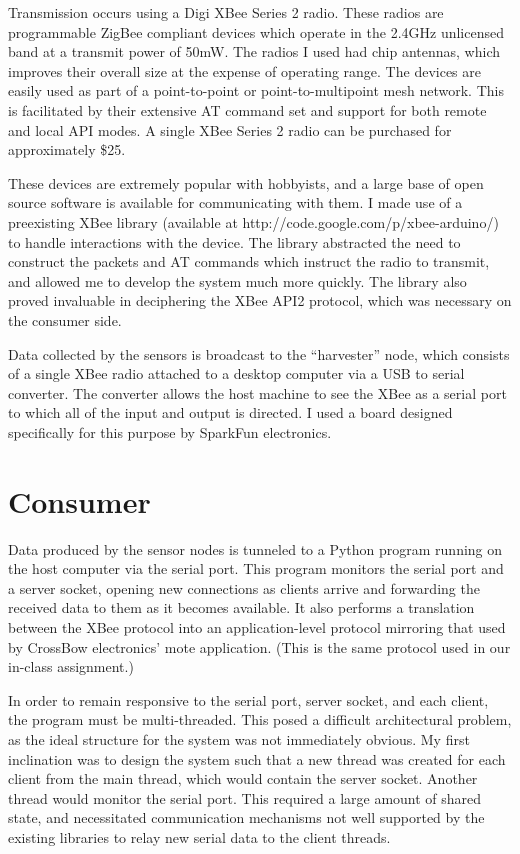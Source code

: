 \documentclass[a4paper,10pt]{article}
\begin{document}
Transmission occurs using a Digi XBee Series 2 radio. These radios are
programmable ZigBee compliant devices which operate in the 2.4GHz unlicensed
band at a transmit power of 50mW. The radios I used had chip antennas, which
improves their overall size at the expense of operating range. The devices are
easily used as part of a point-to-point or point-to-multipoint mesh
network. This is facilitated by their extensive AT command set and support for
both remote and local API modes. A single XBee Series 2 radio can be purchased
for approximately \$25.

These devices are extremely popular with hobbyists, and a large base of open
source software is available for communicating with them. I made use of a
preexisting XBee library (available at http://code.google.com/p/xbee-arduino/)
to handle interactions with the device. The library abstracted the need to
construct the packets and AT commands which instruct the radio to transmit, and
allowed me to develop the system much more quickly. The library also proved invaluable in
deciphering the XBee API2 protocol, which was necessary on the consumer side.

Data collected by the sensors is broadcast to the ``harvester'' node, which
consists of a single XBee radio attached to a desktop computer via a USB to
serial converter. The converter allows the host machine to see the XBee as a
serial port to which all of the input and output is directed. I used a board
designed specifically for this purpose by SparkFun electronics.

\section{Consumer}
Data produced by the sensor nodes is tunneled to a Python program running on the
host computer via the serial port. This program monitors the serial port and a
server socket, opening new connections as clients arrive and forwarding the
received data to them as it becomes available. It also performs a translation
between the XBee protocol into an application-level protocol mirroring that used
by CrossBow electronics' mote application. (This is the same protocol used in
our in-class assignment.)

In order to remain responsive to the serial port, server socket, and each
client, the program must be multi-threaded. This posed a difficult architectural
problem, as the ideal structure for the system was not immediately obvious. My
first inclination was to design the system such that a new thread was created
for each client from the main thread, which would contain the server
socket. Another thread would monitor the serial port. This required a large
amount of shared state, and necessitated communication mechanisms not well
supported by the existing libraries to relay new serial data to the client
threads.
\end{document}
